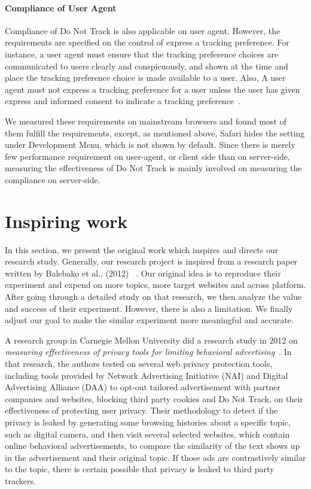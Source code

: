 \documentclass{sig-alternate}
\begin{document}
\paragraph{Compliance of User Agent}

Compliance of Do Not Track is also applicable on user agent. However, the requirements are specified on the control of express a tracking preference. For instance, a user agent must ensure that the tracking preference choices are communicated to users clearly and conspicuously, and shown at the time and place the tracking preference choice is made available to a user. Also, A user agent must not express a tracking preference for a user unless the user has given express and informed consent to indicate a tracking preference~\cite{w3ctrackingcompliance}.

We measured these requirements on mainstream browsers and found most of them fulfill the requirements, except, as mentioned above, Safari hides the setting under Development Menu, which is not shown by default. Since there is merely few performance requirement on user-agent, or client side than on server-side, measuring the effectiveness of Do Not Track is mainly involved on measuring the compliance on server-side. 


\section{Inspiring work} \label{sec:lorrie}

In this section, we present the original work which inspires and directs our research study. Generally, our research project is inspired from a research paper written by Balebako et al., (2012) ~\cite{balebako2012measuring}. Our original idea is to reproduce their experiment and expend on more topics, more target websites and across platform. After going through a detailed study on that research, we then analyze the value and success of their experiment. However, there is also a limitation. We finally adjust our goal to make the similar experiment more meaningful and accurate.

A research group in Carnegie Mellon University did a research study in 2012 on \emph{measuring effectiveness of privacy tools for limiting behavioral advertising}~\cite{balebako2012measuring}. In that research, the authors tested on several web privacy protection tools, including tools provided by Network Advertising Initiative (NAI) and Digital Advertising Alliance (DAA) to opt-out tailored advertisement with partner companies and websites, blocking third party cookies and Do Not Track, on their effectiveness of protecting user privacy. Their methodology to detect if the privacy is leaked by generating some browsing histories about a specific topic, such as digital camera, and then visit several selected websites, which contain online behavioral advertisements, to compare the similarity of the text shows up in the advertisement and their original topic. If those ads are contrastively similar to the topic, there is certain possible that privacy is leaked to third party trackers.
\end{document}
